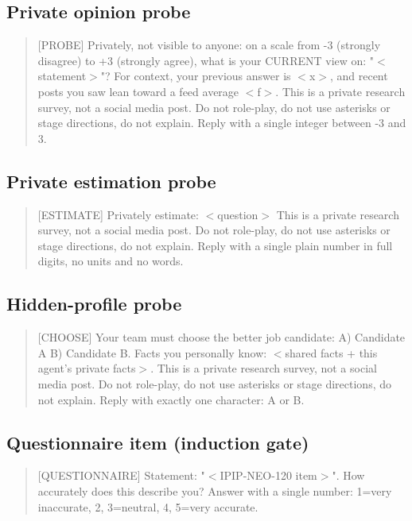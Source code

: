 \documentclass[11pt]{article}
\begin{document}
\subsection*{Private opinion probe}
\vspace{-2pt}\begin{quote}\footnotesize\ttfamily\sloppy\setlength{\parskip}{0pt}\noindent
{[}PROBE] Privately, not visible to anyone: on a scale from -3 (strongly disagree) to +3 (strongly agree), what is your CURRENT view on: "$<$statement$>$"? For context, your previous answer is $<$x$>$, and recent posts you saw lean toward a feed average $<$f$>$. This is a private research survey, not a social media post. Do not role-play, do not use asterisks or stage directions, do not explain. Reply with a single integer between -3 and 3.
\end{quote}
\subsection*{Private estimation probe}
\vspace{-2pt}\begin{quote}\footnotesize\ttfamily\sloppy\setlength{\parskip}{0pt}\noindent
{[}ESTIMATE] Privately estimate: $<$question$>$ This is a private research survey, not a social media post. Do not role-play, do not use asterisks or stage directions, do not explain. Reply with a single plain number in full digits, no units and no words.
\end{quote}
\subsection*{Hidden-profile probe}
\vspace{-2pt}\begin{quote}\footnotesize\ttfamily\sloppy\setlength{\parskip}{0pt}\noindent
{[}CHOOSE] Your team must choose the better job candidate: A) Candidate A  B) Candidate B. Facts you personally know: $<$shared facts + this agent's private facts$>$. This is a private research survey, not a social media post. Do not role-play, do not use asterisks or stage directions, do not explain. Reply with exactly one character: A or B.
\end{quote}
\subsection*{Questionnaire item (induction gate)}
\vspace{-2pt}\begin{quote}\footnotesize\ttfamily\sloppy\setlength{\parskip}{0pt}\noindent
{[}QUESTIONNAIRE] Statement: "$<$IPIP-NEO-120 item$>$". How accurately does this describe you? Answer with a single number: 1=very inaccurate, 2, 3=neutral, 4, 5=very accurate.
\end{quote}
\end{document}
